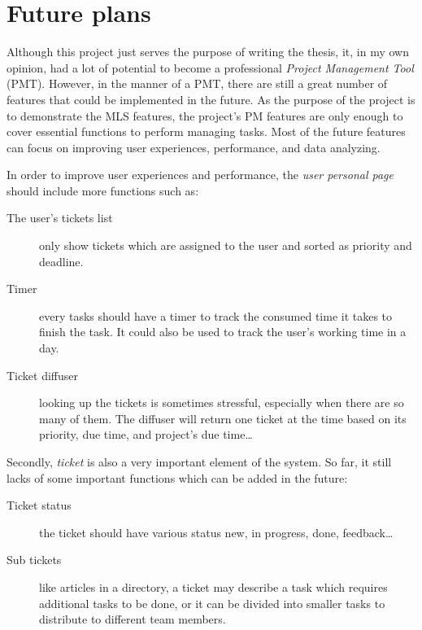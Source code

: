 
\chapter{Future plans} %

\label{ch:future_plan} %

Although this project just serves the purpose of writing the thesis, it, in my own opinion, had a lot of potential to become a professional \emph{Project Management Tool} (PMT).
However, in the manner of a PMT, there are still a great number of features that could be implemented in the future.
As the purpose of the project is to demonstrate the MLS features, the project's PM features are only enough to cover essential functions to perform managing tasks.
Most of the future features can focus on improving user experiences, performance, and data analyzing.

In order to improve user experiences and performance, the \emph{user personal page} should include more functions such as:
\begin{description}
\item[The user's tickets list] only show tickets which are assigned to the user and sorted as priority and deadline.
\item[Timer] every tasks should have a timer to track the consumed time it takes to finish the task.
It could also be used to track the user's working time in a day.
\item[Ticket diffuser] looking up the tickets is sometimes stressful, especially when there are so many of them.
The diffuser will return one ticket at the time based on its priority, due time, and project's due time\dots
\end{description}

Secondly, \emph{ticket} is also a very important element of the system.
So far, it still lacks of some important functions which can be added in the future:
\begin{description}
\item[Ticket status] the ticket should have various status \eg new, in progress, done, feedback\dots
\item[Sub tickets] like articles in a directory, a ticket may describe a task which requires additional tasks to be done, or it can be divided into smaller tasks to distribute to different team members.
\end{description}

